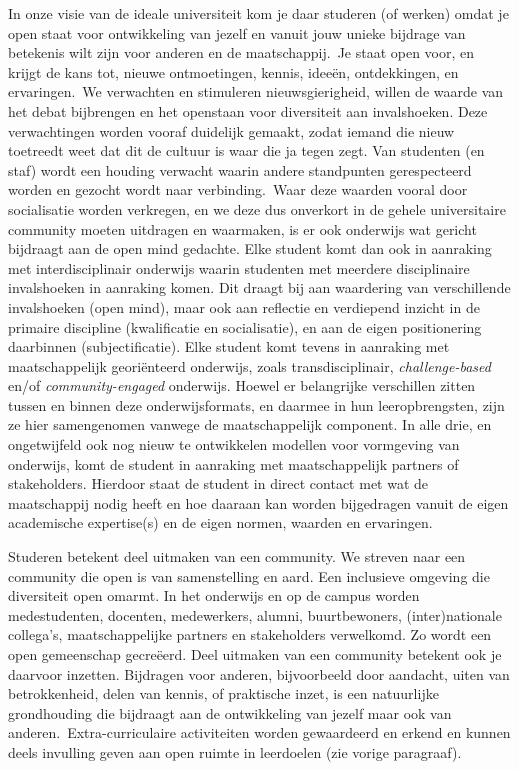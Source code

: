 \documentclass[smallauthor, chapterhaspagenum, nochapterinheader, pagenuminheader,  bigchapnum,medium2, tocpages,  garamond, titleinheader]{jote-book}
\begin{document}
	In onze visie van de ideale universiteit kom je daar studeren (of werken) omdat je open staat voor ontwikkeling van jezelf en vanuit jouw unieke bijdrage van betekenis wilt zijn voor anderen en de maatschappij. Je staat open voor, en krijgt de kans tot, nieuwe ontmoetingen, kennis, ideeën, ontdekkingen, en ervaringen. We verwachten en stimuleren nieuwsgierigheid, willen de waarde van het debat bijbrengen en het openstaan voor diversiteit aan invalshoeken. Deze verwachtingen worden vooraf duidelijk gemaakt, zodat iemand die nieuw toetreedt weet dat dit de cultuur is waar die ja tegen zegt. Van studenten (en staf) wordt een houding verwacht waarin andere standpunten gerespecteerd worden en gezocht wordt naar verbinding. Waar deze waarden vooral door socialisatie worden verkregen, en we deze dus onverkort in de gehele universitaire community moeten uitdragen en waarmaken, is er ook onderwijs wat gericht bijdraagt aan de open mind gedachte. Elke student komt dan ook in aanraking met interdisciplinair onderwijs waarin studenten met meerdere disciplinaire invalshoeken in aanraking komen. Dit draagt bij aan waardering van verschillende invalshoeken (open mind), maar ook aan reflectie en verdiepend inzicht in de primaire discipline (kwalificatie en socialisatie), en aan de eigen positionering daarbinnen (subjectificatie). Elke student komt tevens in aanraking met maatschappelijk georiënteerd onderwijs, zoals transdisciplinair, \emph{c}\emph{hallenge}\emph{-b}\emph{ased} en/of \emph{c}\emph{ommunity}\emph{-}\emph{e}\emph{ngaged} onderwijs. Hoewel er belangrijke verschillen zitten tussen en binnen deze onderwijsformats, en daarmee in hun leeropbrengsten, zijn ze hier samengenomen vanwege de maatschappelijk component. In alle drie, en ongetwijfeld ook nog nieuw te ontwikkelen modellen voor vormgeving van onderwijs, komt de student in aanraking met maatschappelijk partners of stakeholders. Hierdoor staat de student in direct contact met wat de maatschappij nodig heeft en hoe daaraan kan worden bijgedragen vanuit de eigen academische expertise(s) en de eigen normen, waarden en ervaringen.



	Studeren betekent deel uitmaken van een community. We streven naar een community die open is van samenstelling en aard. Een inclusieve omgeving die diversiteit open omarmt. In het onderwijs en op de campus worden medestudenten, docenten, medewerkers, alumni, buurtbewoners, (inter)nationale collega's, maatschappelijke partners en stakeholders verwelkomd. Zo wordt een open gemeenschap gecreëerd. Deel uitmaken van een community betekent ook je daarvoor inzetten. Bijdragen voor anderen, bijvoorbeeld door aandacht, uiten van betrokkenheid, delen van kennis, of praktische inzet, is een natuurlijke grondhouding die bijdraagt aan de ontwikkeling van jezelf maar ook van anderen. Extra-curriculaire activiteiten worden gewaardeerd en erkend en kunnen deels invulling geven aan open ruimte in leerdoelen (zie vorige paragraaf).
\end{document}
